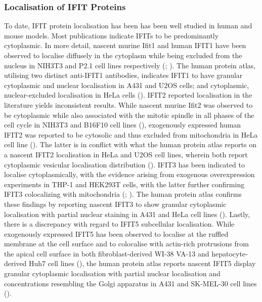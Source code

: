 \subsubsection{Localisation of IFIT Proteins} \label{Localisation of IFIT Proteins}
To date, IFIT protein localisation has been has been well studied in human and mouse models. Most publications indicate IFITs to be predominantly cytoplasmic. In more detail, nascent murine Ifit1 and human IFIT1 have been observed to localise diffusely in the cytoplasm while being excluded from the nucleus in NIH3T3 and P2.1 cell lines respectively (\cite{Pichlmair2011IFIT1RNA}; \cite{Terenzi2008Interferon-inducibleE1}). The human protein atlas, utilising two distinct anti-IFIT1 antibodies, indicates IFIT1 to have granular cytoplasmic and nuclear localisation in A431 and U2OS cells; and cytoplasmic, nuclear-excluded localisation in HeLa cells (\cite{Thul2017AProteome}). IFIT2 reported localisation in the literature yields inconsistent results. While nascent murine Ifit2 was observed to be cytoplasmic while also associated with the mitotic spindle in all phases of the cell cycle in NIH3T3 and B16F10 cell lines (\cite{Saha2006IdentificationProtein}), exogenously expressed human IFIT2 was reported to be cytosolic and thus excluded from mitochondria in HeLa cell line (\cite{Stawowczyk2011TheApoptosis}). The latter is in conflict with what the human protein atlas reports on a nascent IFIT2 localisation in HeLa and U2OS cell lines, wherein both report cytoplasmic vesicular localisation distribution (\cite{Thul2017AProteome}). IFIT3 has been indicated to localise cytoplasmically, with the evidence arising from exogenous overexpression experiments in THP-1 and HEK293T cells, with the latter further confirming IFIT3 colocalizing with mitochondria (\cite{Huang2008Interferon-inducedCells}; \cite{Liu2011IFN-InducedTBK1}). The human protein atlas confirms these findings by reporting nascent IFIT3 to show granular cytoplasmic localisation with partial nuclear staining in A431 and HeLa cell lines (\cite{Thul2017AProteome}). Lastly, there is a discrepancy with regard to IFIT5 subcellular localisation. While exogenously expressed IFIT5 has been observed to localise at the ruffled membrane at the cell surface and to colocalise with actin-rich protrusions from the apical cell surface in both fibroblast-derived WI-38 VA-13 and hepatocyte-derived Huh7 cell lines (\cite{Katibah2013TRNAIFIT5}), the human protein atlas reports nascent IFIT5 display granular cytoplasmic localisation with partial nuclear localisation and concentrations resembling the Golgi apparatus in A431 and SK-MEL-30 cell lines (\cite{Thul2017AProteome}). 

